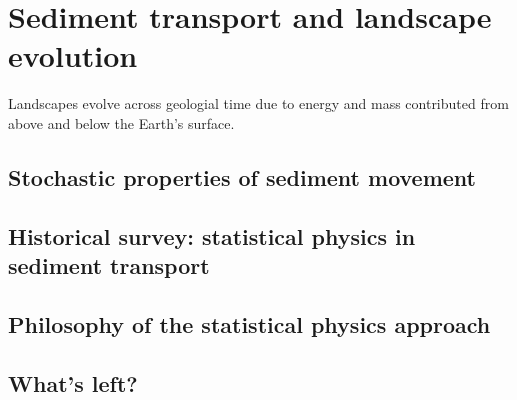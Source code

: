 
\chapter{Sediment transport and landscape evolution}
\label{ch:Introduction}

Landscapes evolve across geologial time due to energy and mass contributed from above and below the Earth's surface. 

\section{Stochastic properties of sediment movement}

\section{Historical survey: statistical physics in sediment transport}

\section{Philosophy of the statistical physics approach}

\section{What's left?}

\endinput

Any text after an \endinput is ignored.
You could put scraps here or things in progress.
